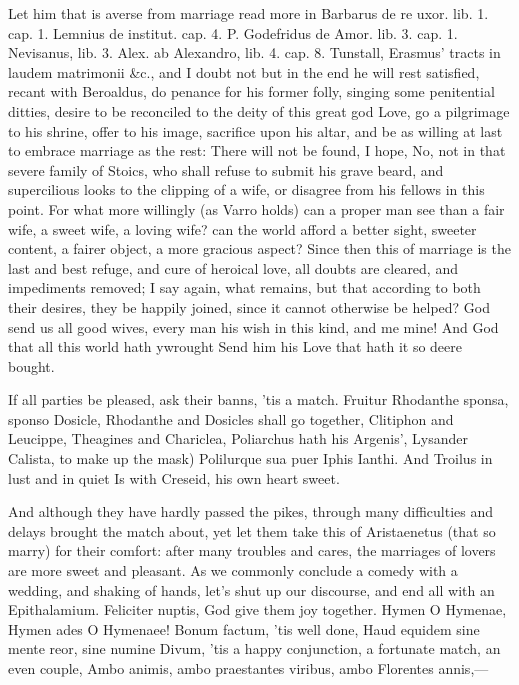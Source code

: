 {Let him that is averse from marriage read more in Barbarus de re uxor.
lib. 1. cap. 1. Lemnius de institut. cap. 4. P. Godefridus de Amor.
lib. 3. cap. 1. Nevisanus, lib. 3. Alex. ab Alexandro, lib. 4.
cap. 8. Tunstall, Erasmus' tracts in laudem matrimonii \&c., and I doubt
not but in the end he will rest satisfied, recant with Beroaldus, do
penance for his former folly, singing some penitential ditties, desire
to be reconciled to the deity of this great god Love, go a pilgrimage
to his shrine, offer to his image, sacrifice upon his altar, and be as
willing at last to embrace marriage as the rest: There will not be
found, I hope, No, not in that severe family of Stoics, who shall
refuse to submit his grave beard, and supercilious looks to the
clipping of a wife, or disagree from his fellows in this point. For
what more willingly (as Varro holds) can a proper man see than a
fair wife, a sweet wife, a loving wife? can the world afford a better
sight, sweeter content, a fairer object, a more gracious aspect?
Since then this of marriage is the last and best refuge, and cure of
heroical love, all doubts are cleared, and impediments removed; I say
again, what remains, but that according to both their desires, they be
happily joined, since it cannot otherwise be helped? God send us all
good wives, every man his wish in this kind, and me mine!
And God that all this world hath ywrought
Send him his Love that hath it so deere bought.

If all parties be pleased, ask their banns, 'tis a match. Fruitur
Rhodanthe sponsa, sponso Dosicle, Rhodanthe and Dosicles shall go
together, Clitiphon and Leucippe, Theagines and Chariclea, Poliarchus
hath his Argenis', Lysander Calista, to make up the mask)
Polilurque sua puer Iphis Ianthi.
And Troilus in lust and in quiet
Is with Creseid, his own heart sweet.

And although they have hardly passed the pikes, through many
difficulties and delays brought the match about, yet let them take this
of  Aristaenetus (that so marry) for their comfort: after
many troubles and cares, the marriages of lovers are more sweet and
pleasant. As we commonly conclude a comedy with a wedding, and
shaking of hands, let's shut up our discourse, and end all with an
Epithalamium.
Feliciter nuptis, God give them joy together. Hymen O Hymenae,
Hymen ades O Hymenaee! Bonum factum, 'tis well done, Haud equidem sine
mente reor, sine numine Divum, 'tis a happy conjunction, a fortunate
match, an even couple,
Ambo animis, ambo praestantes viribus, ambo
Florentes annis,---

}
